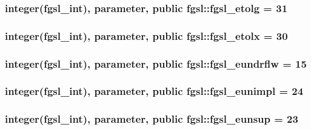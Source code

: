 \subsubsection[{fgsl\+\_\+etolg}]{\setlength{\rightskip}{0pt plus 5cm}integer({\bf fgsl\+\_\+int}), parameter, public fgsl\+::fgsl\+\_\+etolg = 31}\label{namespacefgsl_a12d84e3678cb637e43f1a7a888558110}
\hypertarget{namespacefgsl_ad136d96d34c4ac68f155224650a94e4c}{}
\subsubsection[{fgsl\+\_\+etolx}]{\setlength{\rightskip}{0pt plus 5cm}integer({\bf fgsl\+\_\+int}), parameter, public fgsl\+::fgsl\+\_\+etolx = 30}\label{namespacefgsl_ad136d96d34c4ac68f155224650a94e4c}
\hypertarget{namespacefgsl_ae5ac5a32777e537541e47cb0419da46c}{}
\subsubsection[{fgsl\+\_\+eundrflw}]{\setlength{\rightskip}{0pt plus 5cm}integer({\bf fgsl\+\_\+int}), parameter, public fgsl\+::fgsl\+\_\+eundrflw = 15}\label{namespacefgsl_ae5ac5a32777e537541e47cb0419da46c}
\hypertarget{namespacefgsl_a3a2e9a31e7f3fc209b5269b82d17117c}{}
\subsubsection[{fgsl\+\_\+eunimpl}]{\setlength{\rightskip}{0pt plus 5cm}integer({\bf fgsl\+\_\+int}), parameter, public fgsl\+::fgsl\+\_\+eunimpl = 24}\label{namespacefgsl_a3a2e9a31e7f3fc209b5269b82d17117c}
\hypertarget{namespacefgsl_af76528fed48ac5623d664d6e66e7ac1b}{}
\subsubsection[{fgsl\+\_\+eunsup}]{\setlength{\rightskip}{0pt plus 5cm}integer({\bf fgsl\+\_\+int}), parameter, public fgsl\+::fgsl\+\_\+eunsup = 23}\label{namespacefgsl_af76528fed48ac5623d664d6e66e7ac1b}
\hypertarget{namespacefgsl_a9f38abe97062020e8a507aaa5bc683ab}{}
